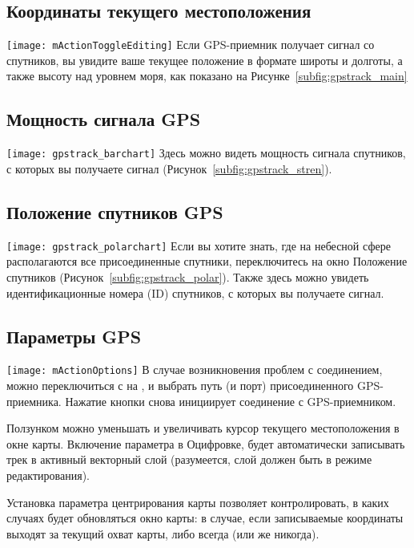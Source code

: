 \subsection{Координаты текущего местоположения}
\texttt{[image: mActionToggleEditing]} Если GPS-приемник
получает сигнал со спутников, вы увидите ваше текущее положение в формате широты
и долготы, а также высоту над уровнем моря, как показано на
Рисунке~\ref{subfig:gpstrack_main}

\subsection{Мощность сигнала GPS}
\texttt{[image: gpstrack\_barchart]} Здесь можно
видеть мощность сигнала спутников, с которых вы получаете сигнал
(Рисунок~\ref{subfig:gpstrack_stren}).

\subsection{Положение спутников GPS}
\texttt{[image: gpstrack\_polarchart]} Если вы
хотите знать, где на небесной сфере располагаются все присоединенные спутники,
переключитесь на окно Положение спутников
(Рисунок~\ref{subfig:gpstrack_polar}). Также здесь можно увидеть
идентификационные номера (ID) спутников, с которых вы получаете сигнал.

\subsection{Параметры GPS}
\texttt{[image: mActionOptions]} В случае
возникновения проблем с соединением, можно переключиться с
 на
, и выбрать путь (и порт)
присоединенного GPS-приемника. Нажатие кнопки 
снова инициирует соединение с GPS-приемником.

Ползунком  можно уменьшать и увеличивать курсор
текущего местоположения в окне карты. Включение параметра
 в Оцифровке, будет
автоматически записывать трек в активный векторный слой (разумеется,
слой должен быть в режиме редактирования).

Установка параметра центрирования карты позволяет контролировать, в каких
случаях будет обновляться окно карты: в случае, если записываемые
координаты выходят за текущий охват карты, либо всегда (или же никогда).

